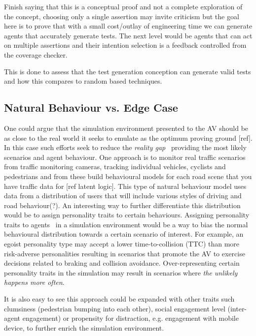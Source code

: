 \documentclass[letterpaper, 10 pt, journal, twoside]{IEEEtran}
\begin{document}
Finish saying that this is a conceptual proof and not a complete exploration of the concept, choosing only a single assertion may invite criticism but the goal here is to prove that with a small cost/outlay of engineering time we can generate agents that accurately generate tests. The next level would be agents that can act on multiple assertions and their intention selection is a feedback controlled from the coverage checker.

This is done to assess that the test generation conception can generate valid tests and how this compares to random based techniques.

\subsection{Natural Behaviour vs. Edge Case}
One could argue that the simulation environment presented to the AV should be as close to the real world it seeks to emulate as the optimum proving ground [ref]. In this case such efforts seek to reduce the \textit{reality gap}~\cite{Jakobi1995} providing the  most likely scenarios and agent behaviour. One approach is to monitor real traffic scenarios from traffic monitoring cameras, tracking individual vehicles, cyclists and pedestrians and from these build behavioural models for each road scene that you have traffic data for [ref latent logic]. This type of natural behaviour model uses data from a distribution of users that will include various styles of driving and road behaviour(?). An interesting way to further differentiate this distribution would be to assign personality traits to certain behaviours. Assigning personality traits to agents~\cite{Zoumpoulaki2010} in a simulation environment would be a way to bias the normal behavioural distribution towards a certain scenario of interest. For example, an egoist personality type may accept a lower time-to-collision (TTC) than more risk-adverse personalities resulting in scenarios that promote the AV to exercise decisions related to braking and collision avoidance. Over-representing certain personality traits in the simulation may result in scenarios where \textit{the unlikely happens more often}. 

It is also easy to see this approach could be expanded with other traits such clumsiness (pedestrian bumping into each other), social engagement level (inter-agent engagement) or propensity for distraction, e.g. engagement with mobile device, to further enrich the simulation environment.
\end{document}
